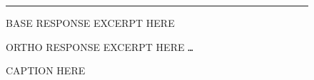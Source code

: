 \begin{figure}[ht!]
\begin{tcolorbox}
  \vspace{4pt}
  \noindent\rule{\linewidth}{0.1pt}
  \vspace{4pt}

  \noindent
  \begin{minipage}[t]{0.47\linewidth}
    \small BASE RESPONSE EXCERPT HERE
  \end{minipage}%
  \hfill
  \begin{minipage}[t]{0.47\linewidth}
    \small ORTHO RESPONSE EXCERPT HERE
    \texttt{\textcolor{red!70!black}{\ldots}}
  \end{minipage}%

\end{tcolorbox}
\caption{CAPTION HERE}
\label{fig:trace-comparison}
\end{figure}
